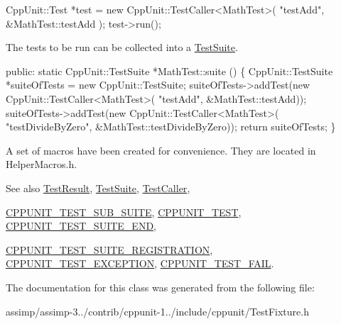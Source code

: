 \begin{DoxyCode}
CppUnit::Test *test = \textcolor{keyword}{new} CppUnit::TestCaller<MathTest>( \textcolor{stringliteral}{"testAdd"}, 
                                                         &MathTest::testAdd );
test->run();
\end{DoxyCode}


The tests to be run can be collected into a \hyperlink{class_test_suite}{Test\+Suite}.


\begin{DoxyCode}
\textcolor{keyword}{public}: 
  \textcolor{keyword}{static} CppUnit::TestSuite *MathTest::suite () \{
     CppUnit::TestSuite *suiteOfTests = \textcolor{keyword}{new} CppUnit::TestSuite;
     suiteOfTests->addTest(\textcolor{keyword}{new} CppUnit::TestCaller<MathTest>(
                             \textcolor{stringliteral}{"testAdd"}, &MathTest::testAdd));
     suiteOfTests->addTest(\textcolor{keyword}{new} CppUnit::TestCaller<MathTest>(
                             \textcolor{stringliteral}{"testDivideByZero"}, &MathTest::testDivideByZero));
     \textcolor{keywordflow}{return} suiteOfTests;
 \}
\end{DoxyCode}


A set of macros have been created for convenience. They are located in Helper\+Macros.\+h.

\begin{DoxySeeAlso}{See also}
\hyperlink{class_test_result}{Test\+Result}, \hyperlink{class_test_suite}{Test\+Suite}, \hyperlink{class_test_caller}{Test\+Caller}, 

\hyperlink{group___writing_test_fixture_gae19f30ade82172cf6c3ff297367a10c2}{C\+P\+P\+U\+N\+I\+T\+\_\+\+T\+E\+S\+T\+\_\+\+S\+U\+B\+\_\+\+S\+U\+I\+T\+E}, \hyperlink{group___writing_test_fixture_gaac9b03d898b207e1daf2f93867935a96}{C\+P\+P\+U\+N\+I\+T\+\_\+\+T\+E\+S\+T}, \hyperlink{group___writing_test_fixture_ga601b2e1d525f3947b216e28c625abcb1}{C\+P\+P\+U\+N\+I\+T\+\_\+\+T\+E\+S\+T\+\_\+\+S\+U\+I\+T\+E\+\_\+\+E\+N\+D}, 

\hyperlink{group___creating_test_suite_ga2f4071eec88d1e306665ada0f2dd80e4}{C\+P\+P\+U\+N\+I\+T\+\_\+\+T\+E\+S\+T\+\_\+\+S\+U\+I\+T\+E\+\_\+\+R\+E\+G\+I\+S\+T\+R\+A\+T\+I\+O\+N}, \hyperlink{group___writing_test_fixture_gaca8eeb6f60714baade6cbfd185868c40}{C\+P\+P\+U\+N\+I\+T\+\_\+\+T\+E\+S\+T\+\_\+\+E\+X\+C\+E\+P\+T\+I\+O\+N}, \hyperlink{group___writing_test_fixture_ga5bdaf0444216a8f93ead13d5ae964d7e}{C\+P\+P\+U\+N\+I\+T\+\_\+\+T\+E\+S\+T\+\_\+\+F\+A\+I\+L}. 
\end{DoxySeeAlso}


The documentation for this class was generated from the following file\+:\begin{DoxyCompactItemize}
\item 
assimp/assimp-\/3../contrib/cppunit-\/1../include/cppunit/Test\+Fixture.\+h\end{DoxyCompactItemize}
